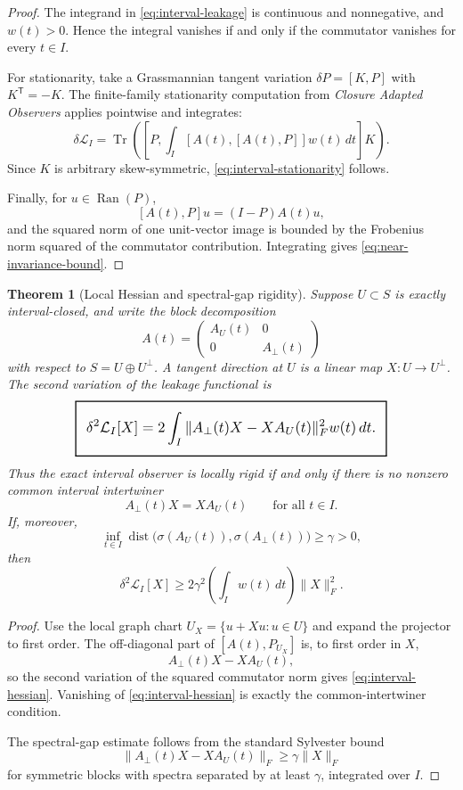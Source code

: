 \documentclass[11pt,a4paper]{article}
\numberwithin{equation}{section}
\DeclareMathOperator{\Tr}{Tr}
\DeclareMathOperator{\Ran}{Ran}
\newcommand{\geomboxed}[1]{%
  \setlength{\fboxsep}{8pt}%
  \setlength{\fboxrule}{0.9pt}%
  \fbox{\scalebox{1.18}{$\displaystyle #1$}}%
}
\theoremstyle{thmcompact}
\newtheorem{theorem}{Theorem}[section]
\theoremstyle{remark}
\begin{document}
\begin{proof}
The integrand in \eqref{eq:interval-leakage} is continuous and nonnegative, and $w(t)>0$. Hence the integral vanishes if and only if the commutator vanishes for every $t\in I$.

For stationarity, take a Grassmannian tangent variation $\delta P=[K,P]$ with $K^{\mathsf T}=-K$. The finite-family stationarity computation from \emph{Closure Adapted Observers} applies pointwise and integrates:
\[
\delta\mathcal L_I
=
\Tr\!\left(
\left[
P,
\int_I[A(t),[A(t),P]]w(t)\,dt
\right]K
\right).
\]
Since $K$ is arbitrary skew-symmetric, \eqref{eq:interval-stationarity} follows.

Finally, for $u\in\Ran(P)$,
\[
[A(t),P]u=(I-P)A(t)u,
\]
and the squared norm of one unit-vector image is bounded by the Frobenius norm squared of the commutator contribution. Integrating gives \eqref{eq:near-invariance-bound}.
\end{proof}

\begin{theorem}[Local Hessian and spectral-gap rigidity]
\label{thm:interval-hessian}
Suppose $U\subset S$ is exactly interval-closed, and write the block decomposition
\[
A(t)=
\begin{pmatrix}
A_U(t)&0\\
0&A_\perp(t)
\end{pmatrix}
\]
with respect to $S=U\oplus U^\perp$. A tangent direction at $U$ is a linear map $X:U\to U^\perp$. The second variation of the leakage functional is
\begin{equation}
\geomboxed{
\delta^2\mathcal L_I[X]
=
2\int_I\|A_\perp(t)X-XA_U(t)\|_F^2w(t)\,dt.
}
\label{eq:interval-hessian}
\end{equation}
Thus the exact interval observer is locally rigid if and only if there is no nonzero common interval intertwiner
\[
A_\perp(t)X=XA_U(t)
\qquad
\text{for all }t\in I.
\]
If, moreover,
\[
\inf_{t\in I}\operatorname{dist}\bigl(\sigma(A_U(t)),\sigma(A_\perp(t))\bigr)\ge \gamma>0,
\]
then
\begin{equation}
\delta^2\mathcal L_I[X]
\ge
2\gamma^2\left(\int_Iw(t)\,dt\right)\|X\|_F^2.
\label{eq:spectral-gap-rigidity}
\end{equation}
\end{theorem}

\begin{proof}
Use the local graph chart $U_X=\{u+Xu:u\in U\}$ and expand the projector to first order. The off-diagonal part of $[A(t),P_{U_X}]$ is, to first order in $X$,
\[
A_\perp(t)X-XA_U(t),
\]
so the second variation of the squared commutator norm gives \eqref{eq:interval-hessian}. Vanishing of \eqref{eq:interval-hessian} is exactly the common-intertwiner condition.

The spectral-gap estimate follows from the standard Sylvester bound
\[
\|A_\perp(t)X-XA_U(t)\|_F\ge \gamma\|X\|_F
\]
for symmetric blocks with spectra separated by at least $\gamma$, integrated over $I$.
\end{proof}
\end{document}
